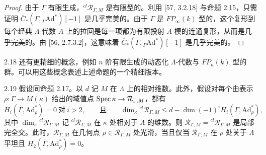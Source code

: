 \begin{proof}
由于 $\Gamma$ 有限生成，${}^{cl}\mathcal R_{\Gamma,M}$ 是有限型的。利用 [57, 3.2.18] 与命题 2.15，只需证明 $\overline{C}_*(\Gamma,{}_\Gamma\mathrm{Ad}^*)[-1]$ 是几乎完美的。由于 $\Gamma$ 是 $FP_\infty(k)$ 型的，这个复形到每个经典 $\Lambda$-代数 $A$ 上的拉回是每一项都为有限投射 $A$-模的连通复形，从而是几乎完美的。由 [56, 2.7.3.2]，这意味着 $\overline{C}_*(\Gamma,{}_\Gamma\mathrm{Ad}^*)[-1]$ 是几乎完美的。
\end{proof}

\begin{rem}{2.18}\label{rem:a2-2-18}
还有更精细的概念，例如 $n$ 阶有限生成的动态化 $\Lambda$-代数与 $FP_n(k)$ 型的群。可以用这些概念表述上述命题的一个精细版本。
\end{rem}

\begin{prop}{2.19}\label{prop:a2-2-19}
假设同命题 2.17。以 $d$ 记 $M$ 在 $\Lambda$ 上的相对维数。此外，假设对每个由表示 $\rho:\Gamma\to M(\kappa)$ 给出的域值点 $\operatorname{Spec}\kappa\to\mathcal R_{\Gamma,M}$，都有
\[
H_i(\Gamma,\mathrm{Ad}^*_\rho)=0\ \text{对}\ i>2,\qquad\text{且}\qquad
\dim_\kappa{}^{cl}\mathcal R_{\Gamma,M}\le d-\dim(-1)^iH_i(\Gamma,\mathrm{Ad}^*_\rho),
\]
其中 $\dim_\kappa{}^{cl}\mathcal R_{\Gamma,M}$ 记 ${}^{cl}\mathcal R_{\Gamma,M}$ 在 $\kappa$ 处相对于 $\Lambda$ 的维数。则 $\mathcal R_{\Gamma,M}={}^{cl}\mathcal R_{\Gamma,M}$ 是局部完全交。此时，$\mathcal R_{\Gamma,M}$ 在几何点 $\rho\in\mathcal R_{\Gamma,M}$ 处光滑，当且仅当 $\mathcal R_{\Gamma,M}$ 在 $\rho$ 处关于 $\Lambda$ 平坦且 $H_2(\Gamma,\mathrm{Ad}^*_\rho)=0$。
\end{prop}

